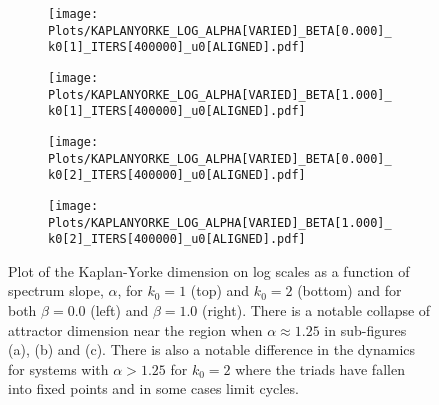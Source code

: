 \documentclass[9pt]{article}
\begin{document}
\begin{figure}[h!]
	\centering
  \begin{subfigure}[b]{0.49\linewidth}
    \texttt{[image: Plots/KAPLANYORKE\_LOG\_ALPHA[VARIED]\_BETA[0.000]\_k0[1]\_ITERS[400000]\_u0[ALIGNED].pdf]}
    \caption{}
  \end{subfigure}
  \begin{subfigure}[b]{0.49\linewidth}
    \texttt{[image: Plots/KAPLANYORKE\_LOG\_ALPHA[VARIED]\_BETA[1.000]\_k0[1]\_ITERS[400000]\_u0[ALIGNED].pdf]}
    \caption{}
  \end{subfigure}
  \begin{subfigure}[b]{0.49\linewidth}
    \texttt{[image: Plots/KAPLANYORKE\_LOG\_ALPHA[VARIED]\_BETA[0.000]\_k0[2]\_ITERS[400000]\_u0[ALIGNED].pdf]}
    \caption{}
  \end{subfigure}
   \begin{subfigure}[b]{0.49\linewidth}
    \texttt{[image: Plots/KAPLANYORKE\_LOG\_ALPHA[VARIED]\_BETA[1.000]\_k0[2]\_ITERS[400000]\_u0[ALIGNED].pdf]}
    \caption{}
  \end{subfigure}
  \caption{Plot of the Kaplan-Yorke dimension on log scales as a function of spectrum slope, $\alpha$, for $k_0 = 1$ (top) and $k_0 = 2$ (bottom) and for both $\beta = 0.0$ (left) and $\beta = 1.0$ (right). There is a notable collapse of attractor dimension near the region when $\alpha \approx 1.25$ in sub-figures (a), (b) and (c). There is also a notable difference in the dynamics for systems with $\alpha > 1.25$ for $k_0 = 2$ where the triads have fallen into fixed points and in some cases limit cycles.}
  \label{fig:1_log}
\end{figure}



\newpage
\end{document}
